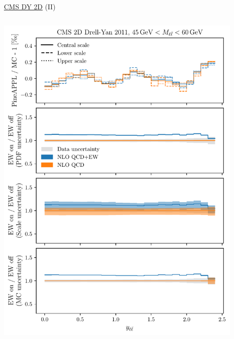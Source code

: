 \begin{frame}{\href{https://arxiv.org/abs/1412.1115}{CMS DY 2D} (II)}
\fontsize{9}{11}\selectfont
\begin{columns}
\begin{column}{0.5\textwidth}
\includegraphics[width=0.95\textwidth]{ew_corrections/figures/pineappl_CMSDY2D11_bin3}
\end{column}
\begin{column}{0.5\textwidth}

\end{column}
\end{columns}
\end{frame}
